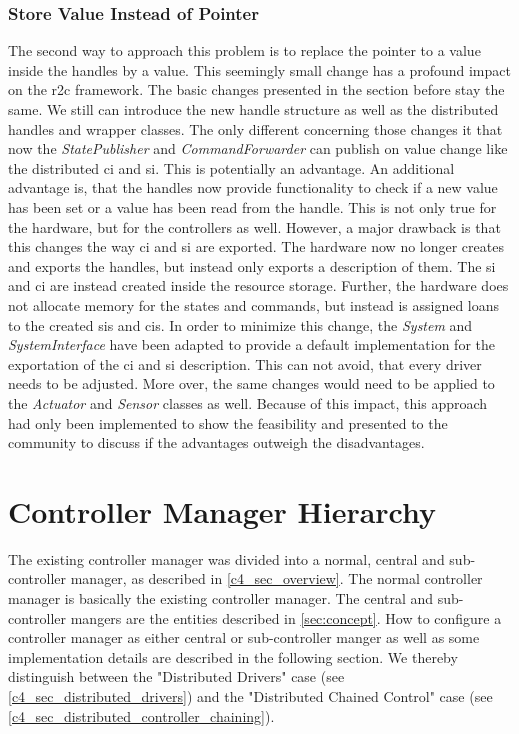 \subsubsection*{Store Value Instead of Pointer} 
The second way to approach this problem is to replace the pointer to a value inside the \glspl{handle} by a value. This seemingly small change has a profound impact on the \gls{r2c} framework. The basic changes presented in the section before stay the same. We still can introduce the new \gls{handle} structure as well as the distributed \glspl{handle} and wrapper classes. The only different concerning those changes it that now the \textit{StatePublisher} and \textit{CommandForwarder} can publish on value change like the distributed \gls{ci} and \gls{si}. This is potentially an advantage. An additional advantage is, that the \glspl{handle} now provide functionality to check if a new value has been set or a value has been read from the handle. This is not only true for the hardware, but for the controllers as well. \newline
However, a major drawback is that this changes the way \gls{ci} and \gls{si} are exported. The hardware now no longer creates and exports the \glspl{handle}, but instead only exports a description of them. The \gls{si} and \gls{ci} are instead created inside the resource storage. Further, the hardware does not allocate memory for the states and commands, but instead is assigned loans to the created \glspl{si} and \glspl{ci}. In order to minimize this change, the \textit{System} and \textit{SystemInterface} have been adapted to provide a default implementation for the exportation of the \gls{ci} and \gls{si} description. This can not avoid, that every driver needs to be adjusted. More over, the same changes would need to be applied to the \textit{Actuator} and \textit{Sensor} classes as well. Because of this impact, this approach had only been implemented to show the feasibility and presented to the community to discuss if the advantages outweigh the disadvantages. 

\section{Controller Manager Hierarchy}
The existing controller manager was divided into a normal, central and sub-controller manager, as described in \autoref{c4_sec_overview}. The normal controller manager is basically the existing controller manager. The central and sub-controller mangers are the entities described in \autoref{sec:concept}. How to configure a controller manager as either central or sub-controller manger as well as some implementation details are described in the following section. We thereby distinguish between the "Distributed Drivers" case (see \autoref{c4_sec_distributed_drivers}) and the "Distributed Chained Control" case (see \autoref{c4_sec_distributed_controller_chaining}).

